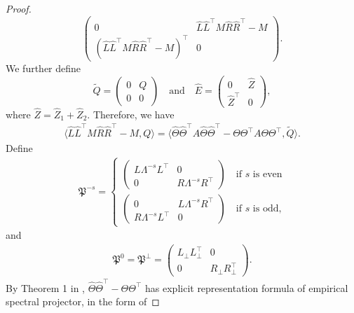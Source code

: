 \documentclass[12pt]{article}
\newcommand{\inp}[2]{\langle #1,#2\rangle}
\theoremstyle{plain}
\begin{document}
\begin{proof}
$$\begin{pmatrix}
        0 & \widehat{L}\widehat{L}^{\top}M\widehat{R}\widehat{R}^{\top}-M \\
        (\widehat{L}\widehat{L}^{\top}M\widehat{R}\widehat{R}^{\top}-M)^{\top} & 0
    \end{pmatrix}.
$$
We further define
$$
    \widetilde{Q}=\begin{pmatrix}
        0 & Q \\
        0 & 0
    \end{pmatrix} \quad \text{and} \quad 
    \widehat{E}= \begin{pmatrix}
        0 & \widehat{Z} \\
        \widehat{Z}^{\top} & 0
    \end{pmatrix},
$$
where $\widehat{Z}=\widehat{Z}_1+\widehat{Z}_2$. Therefore, we have
\begin{align*}
    \inp{\widehat{L}\widehat{L}^{\top}M\widehat{R}\widehat{R}^{\top}-M}{Q}=\inp{\widehat{\Theta}\widehat{\Theta}^{\top}A\widehat{\Theta}\widehat{\Theta}^{\top}-\Theta\Theta^{\top}A\Theta\Theta^{\top}}{\widetilde{Q}}.
\end{align*}
Define
    \begin{align*}
        \mathfrak{P}^{-s}=\left\{
        \begin{aligned}
            \begin{pmatrix}
                L\Lambda^{-s}L^{\top} & 0 \\
                0 & R\Lambda^{-s}R^{\top}
            \end{pmatrix} \quad \text{if $s$ is even}  \\
            \begin{pmatrix}
                0 &  L\Lambda^{-s}R^{\top}\\
                R\Lambda^{-s}L^{\top} & 0
            \end{pmatrix} \quad \text{if $s$ is odd,} 
        \end{aligned} \right.
    \end{align*}
    and
    \begin{align*}
        \mathfrak{P}^0=\mathfrak{P}^{\perp}=\begin{pmatrix}
            L_{\perp}L_{\perp}^{\top} & 0 \\
            0 & R_{\perp}R_{\perp}^{\top}
        \end{pmatrix}.
    \end{align*}
By Theorem 1 in \cite{xia2021normal}, $\widehat{\Theta}\widehat{\Theta}^{\top}-\Theta\Theta^{\top}$ has explicit representation formula of empirical spectral projector, in the form of 

\end{proof}
\end{document}
